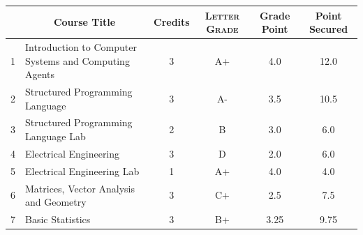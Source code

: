 \documentclass[11pt]{article}
\newcommand*{\numtwo}[1]{\pgfmathprintnumber[
                    fixed, precision=2, fixed zerofill=true]{#1}}
\begin{document}
                \begin{center}
                    \renewcommand{\arraystretch}{1.08}
                    
                \begin{tabular}{|c|l|c|>{\scshape}c|c|c|}
                \hline  \rule[-1ex]{0pt}{3.5ex} {\centering{\bf Course Code}} &  \multicolumn{1}{c|}{\textbf{Course Title}}  & {\bf Credits} & {\bf Letter Grade} & {\bf Grade Point} & {\bf Point Secured}  \\ 
                \hline   1 &  Introduction to Computer Systems and Computing Agents		 & 3 & A+ & 4.0 & 12.0 \\ %
                \hline   2 &  Structured Programming Language		 & 3 & A- & 3.5 & 10.5 \\ %
                \hline   3 &  Structured Programming Language Lab		 & 2 & B & 3.0 & 6.0 \\ %
                \hline   4 &  Electrical Engineering		 & 3 & D & 2.0 & 6.0 \\ %
                \hline   5 &  Electrical Engineering Lab		 & 1 & A+ & 4.0 & 4.0 \\ %
                \hline   6 &  Matrices, Vector Analysis and Geometry		 & 3 & C+ & 2.5 & 7.5 \\ %
                \hline   7 &  Basic Statistics		 & 3 & B+ & 3.25 & 9.75 \\ %

\hline                %
                \end{tabular}
                \end{center}
                \renewcommand{\arraystretch}{1.03}
\end{document}
